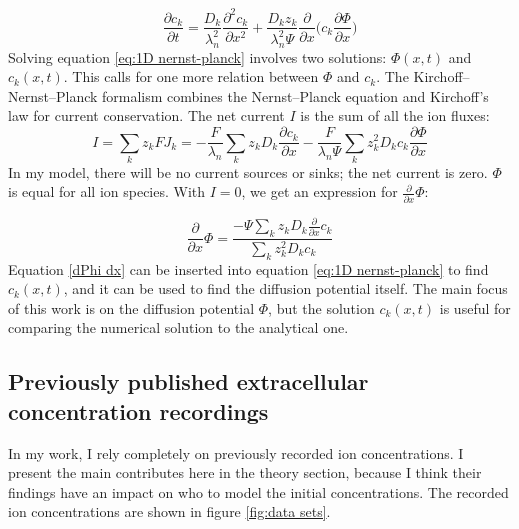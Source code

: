 \documentclass{article}
\begin{document}
\begin{equation}\label{eq:1D nernst-planck}
\frac{\partial c_k}{\partial t}= \frac{D_k}{\lambda_n^2} \frac{\partial^2 c_k}{\partial x^2}+\frac{D_k z_k}{\lambda_n^2 \Psi} \frac{\partial }{\partial x}  \bigg(c_k \frac{\partial \Phi}{\partial x} \bigg)
\end{equation}
Solving equation \ref{eq:1D nernst-planck} involves two solutions: $\Phi (x,t)$ and $c_k(x,t)$. This calls for one more relation between $\Phi$ and $c_k$. The Kirchoff--Nernst--Planck formalism combines the Nernst--Planck equation and Kirchoff's law for current conservation. 
The net current $I$ is the sum of all the ion fluxes:
\begin{equation}\label{eq:current sum}
I = \sum_{k}z_k FJ_k = -\frac{F}{\lambda_n}\sum_k z_k D_k  \frac{\partial c_k}{ \partial x} - \frac{F}{\lambda_n \Psi}\sum_k z_k^2D_k c_k \frac{\partial \Phi}{\partial x}
\end{equation}
In my model, there will be no current sources or sinks; the net current is zero. 
$\Phi$ is equal for all ion species. With $I =0$, we get an expression for $ \frac{\partial}{\partial x} \Phi$:

\begin{equation}\label{dPhi dx}
\frac{\partial}{\partial x} \Phi = \frac{-\Psi \sum_k z_k D_k \frac{\partial}{\partial x} c_k}{\sum_k z_k^2 D_k c_k}
\end{equation}
Equation \ref{dPhi dx} can be inserted into equation \ref{eq:1D nernst-planck} to find $c_k(x,t)$, and it can be used to find the diffusion potential itself. The main focus of this work is on the diffusion potential $\Phi$, but the solution $c_k(x,t)$ is useful for comparing the numerical solution to the analytical one.

\subsection{Previously published extracellular concentration recordings}\label{EC c recordings}
In my work, I rely completely on previously recorded ion concentrations. I present the main contributes here in the theory section, because I think their findings have an impact on who to model the initial concentrations. The recorded ion concentrations are shown in figure \ref{fig:data sets}.
\end{document}

